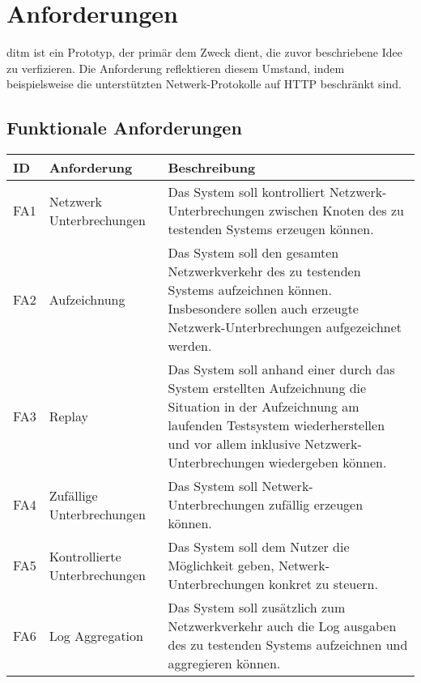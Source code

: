 \documentclass[a4paper]{report}
\begin{document}
\section{Anforderungen}
ditm ist ein Prototyp, der primär dem Zweck dient, die zuvor beschriebene Idee zu verfizieren.
Die Anforderung reflektieren diesem Umstand, indem beispielsweise die unterstützten Netwerk-Protokolle auf HTTP beschränkt sind.
\subsection{Funktionale Anforderungen}
\begin{table}[]
	\begin{tabular}{|l|l|p{7cm}|}
		\hline
		ID   & Anforderung                   & Beschreibung                                                                                                                                                                                                          \\ \hline
		FA1  & Netzwerk Unterbrechungen      & Das System soll kontrolliert Netzwerk-Unterbrechungen zwischen Knoten des zu testenden Systems erzeugen können.                                                                                                       \\ \hline
		FA2  & Aufzeichnung                  & Das System soll den gesamten Netzwerkverkehr des zu testenden Systems aufzeichnen können. Insbesondere sollen auch erzeugte Netzwerk-Unterbrechungen aufgezeichnet werden.                                           \\ \hline
		FA3  & Replay                        & Das System soll anhand einer durch das System erstellten Aufzeichnung die Situation in der Aufzeichnung am laufenden Testsystem wiederherstellen und vor allem inklusive Netzwerk-Unterbrechungen wiedergeben können. \\ \hline
		FA4  & Zufällige Unterbrechungen     & Das System soll Netwerk-Unterbrechungen zufällig erzeugen können.                                                                                                                                                     \\ \hline
		FA5  & Kontrollierte Unterbrechungen & Das System soll dem Nutzer die Möglichkeit geben, Netwerk-Unterbrechungen konkret zu steuern.                                                                                                                         \\ \hline
		FA6  & Log Aggregation               & Das System soll zusätzlich zum Netzwerkverkehr auch die Log ausgaben des zu testenden Systems aufzeichnen und aggregieren können.                                                                                     \\ \hline

\end{tabular}
\end{table}
\end{document}
